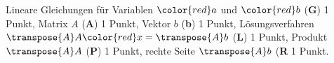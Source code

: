 \begin{bewertung}
Lineare Gleichungen für Variablen ${\color{red}a}$ und ${\color{red}b}$
({\bf G}) 1 Punkt,
Matrix $A$ ({\bf A}) 1 Punkt,
Vektor $b$ ({\bf b}) 1 Punkt,
Lösungsverfahren $\transpose{A}A{\color{red}x} = \transpose{A}b$ ({\bf L}) 1 Punkt,
Produkt $\transpose{A}A$ ({\bf P}) 1 Punkt,
rechte Seite $\transpose{A}b$ ({\bf R} 1 Punkt.
\end{bewertung}




